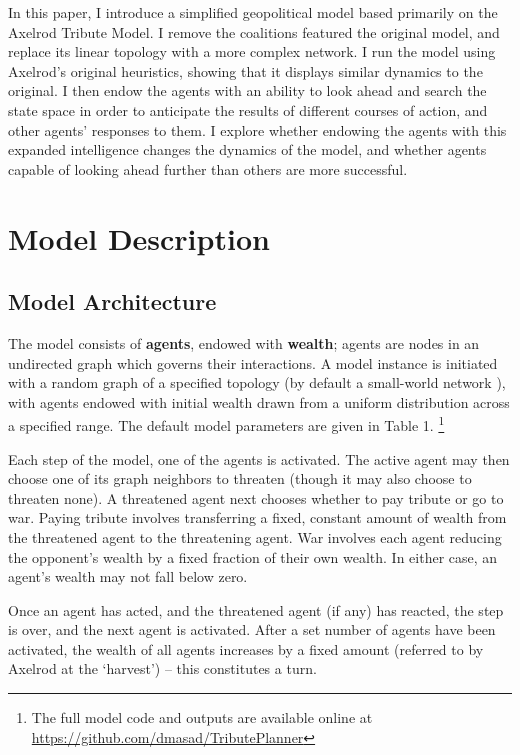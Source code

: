 \documentclass{article}
\begin{document}
In this paper, I introduce a simplified geopolitical model based primarily on the Axelrod Tribute Model. I remove the coalitions featured the original model, and replace its linear topology with a more complex network. I run the model using Axelrod's original heuristics, showing that it displays similar dynamics to the original. I then endow the agents with an ability to look ahead and search the state space in order to anticipate the results of different courses of action, and other agents' responses to them. I explore whether endowing the agents with this expanded intelligence changes the dynamics of the model, and whether agents capable of looking ahead further than others are more successful. 

\section{Model Description}

\subsection{Model Architecture}

The model consists of \textbf{agents}, endowed with \textbf{wealth}; agents are nodes in an undirected graph which governs their interactions. A model instance is initiated with a random graph of a specified topology (by default a small-world network \citep{watts_1998}), with agents endowed with initial wealth drawn from a uniform distribution across a specified range. The default model parameters are given in Table 1.  \footnote{The full model code and outputs are available online at \url{https://github.com/dmasad/TributePlanner}}

Each step of the model, one of the agents is activated. The active agent may then choose one of its graph neighbors to threaten (though it may also choose to threaten none). A threatened agent next chooses whether to pay tribute or go to war. Paying tribute involves transferring a fixed, constant amount of wealth from the threatened agent to the threatening agent. War involves each agent reducing the opponent's wealth by a fixed fraction of their own wealth. In either case, an agent's wealth may not fall below zero. 

Once an agent has acted, and the threatened agent (if any) has reacted, the step is over, and the next agent is activated. After a set number of agents have been activated, the wealth of all agents increases by a fixed amount (referred to by Axelrod at the `harvest') -- this constitutes a turn.
\end{document}
